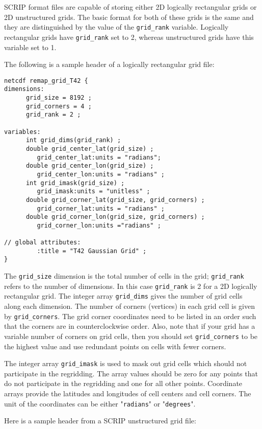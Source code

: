 SCRIP format files are capable of storing either 2D logically rectangular
grids or 2D unstructured grids. The basic format for both of these grids is the same and they are distinguished by the
value of the {\tt grid\_rank} variable. Logically rectangular grids have {\tt grid\_rank} set to 2,
whereas unstructured grids have this variable set to 1.

The following is a sample header of a logically rectangular grid file:

\begin{verbatim}
netcdf remap_grid_T42 {
dimensions:
      grid_size = 8192 ;
      grid_corners = 4 ;
      grid_rank = 2 ;

variables:
      int grid_dims(grid_rank) ;
      double grid_center_lat(grid_size) ;
         grid_center_lat:units = "radians";
      double grid_center_lon(grid_size) ;
         grid_center_lon:units = "radians" ;
      int grid_imask(grid_size) ;
         grid_imask:units = "unitless" ;
      double grid_corner_lat(grid_size, grid_corners) ;
         grid_corner_lat:units = "radians" ;
      double grid_corner_lon(grid_size, grid_corners) ;
         grid_corner_lon:units ="radians" ;

// global attributes:
         :title = "T42 Gaussian Grid" ;
}
\end{verbatim}

The {\tt grid\_size} dimension is the total number of cells in the grid; {\tt grid\_rank} refers to the
number of dimensions. In this case {\tt grid\_rank} is 2 for a 2D logically rectangular grid.
The integer array {\tt grid\_dims} gives the number of grid cells along each dimension.
The number of corners (vertices) in each grid cell is given by {\tt grid\_corners}.
The grid corner coordinates need to be listed in an order such that the corners are in counterclockwise
order.  Also, note that if your grid has a variable number of corners on grid cells, then
you should set {\tt grid\_corners} to be the highest value and use redundant points
on cells with fewer corners.

The integer array {\tt grid\_imask} is used to mask out grid cells which should
not participate in the regridding. The array values should be zero for any points
that do not participate in the regridding and one for all other points.
Coordinate arrays provide the latitudes and longitudes of cell centers
and cell corners. The unit of the coordinates can be either "{\tt radians}" or "{\tt degrees}".

Here is a sample header from a SCRIP unstructured grid file:

